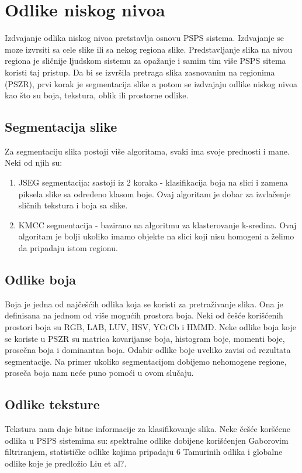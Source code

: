 \documentclass{article}
\begin{document}
\section{Odlike niskog nivoa}
Izdvajanje odlika niskog nivoa pretstavlja osnovu PSPS sistema. Izdvajanje se moze izvrsiti sa cele slike ili sa nekog regiona slike. Predstavljanje slika na nivou regiona je sličnije ljudskom sistemu za opažanje i samim tim više PSPS sitema koristi taj pristup. Da bi se izvršila pretraga slika zasnovanim na regionima (PSZR), prvi korak je segmentacija slike a potom se izdvajaju odlike niskog nivoa kao što su boja, tekstura, oblik ili prostorne odlike.

\subsection{Segmentacija slike}
Za segmentaciju slika postoji više algoritama, svaki ima svoje prednosti i mane. Neki od njih su:
\begin{enumerate}
\item JSEG segmentacija: sastoji iz 2 koraka - klasifikacija boja na slici i zamena piksela slike sa određeno klasom boje. Ovaj algoritam je dobar za izvlačenje sličnih tekstura i boja sa slike.
\item KMCC segmentacija - bazirano na algoritmu za klasterovanje k-sredina. Ovaj algoritam je bolji ukoliko imamo objekte na slici koji nisu homogeni a želimo da pripadaju istom regionu.
\end{enumerate}

\subsection{Odlike boja}
Boja je jedna od najčešćih odlika koja se koristi za pretraživanje slika. Ona je definisana na jednom od više mogućih prostora boja. Neki od češće korišćenih prostori boja su RGB, LAB, LUV, HSV, YCrCb i HMMD. Neke odlike boja koje se koriste u PSZR su matrica kovarijanse boja, histogram boje, momenti boje, prosečna boja i dominantna boja. Odabir odlike boje uveliko zavisi od rezultata segmentacije. Na primer ukoliko segmentacijom dobijemo nehomogene regione, proseča boja nam neće puno pomoći u ovom slučaju.

\subsection{Odlike teksture}
Tekstura nam daje bitne informacije za klasifikovanje slika. Neke češće koršćene odlika u PSPS sistemima su: spektralne odlike dobijene korišćenjen Gaborovim filtriranjem, statističke odlike kojima pripadaju 6 Tamurinih odlika i globalne odlike koje je predložio Liu et al?.
\end{document}

